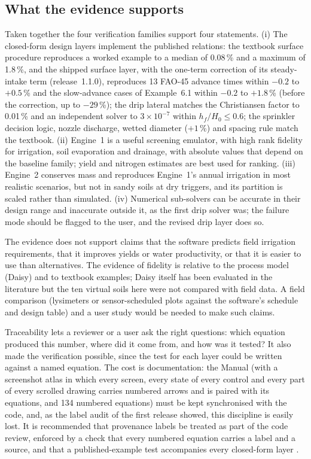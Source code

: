 \subsection{What the evidence supports}
Taken together the four verification families support four statements. (i) The closed-form design layers implement the published relations: the textbook surface procedure reproduces a worked example to a median of 0.08\,\% and a maximum of 1.8\,\%, and the shipped surface layer, with the one-term correction of its steady-intake term (release~1.1.0), reproduces 13 FAO-45 advance times within $-0.2$ to $+0.5$\,\% and the slow-advance cases of Example~6.1 within $-0.2$ to $+1.8$\,\% (before the correction, up to $-29$\,\%); the drip lateral matches the Christiansen factor to 0.01\,\% and an independent solver to $3\times10^{-7}$ within $h_f/H_0\le0.6$; the sprinkler decision logic, nozzle discharge, wetted diameter ($+1$\,\%) and spacing rule match the textbook. (ii) Engine~1 is a useful screening emulator, with high rank fidelity for irrigation, soil evaporation and drainage, with absolute values that depend on the baseline family; yield and nitrogen estimates are best used for ranking. (iii) Engine~2 conserves mass and reproduces Engine~1's annual irrigation in most realistic scenarios, but not in sandy soils at dry triggers, and its partition is scaled rather than simulated. (iv) Numerical sub-solvers can be accurate in their design range and inaccurate outside it, as the first drip solver was; the failure mode should be flagged to the user, and the revised drip layer does so.

The evidence does not support claims that the software predicts field irrigation requirements, that it improves yields or water productivity, or that it is easier to use than alternatives. The evidence of fidelity is relative to the process model (Daisy) and to textbook examples; Daisy itself has been evaluated in the literature \citep{Hansen2012,Holbak2026} but the ten virtual soils here were not compared with field data. A field comparison (lysimeters or sensor-scheduled plots against the software's schedule and design table) and a user study would be needed to make such claims.

Traceability lets a reviewer or a user ask the right questions: which equation produced this number, where did it come from, and how was it tested? It also made the verification possible, since the test for each layer could be written against a named equation. The cost is documentation: the Manual (with a screenshot atlas in which every screen, every state of every control and every part of every scrolled drawing carries numbered arrows and is paired with its equations, and 134 numbered equations) must be kept synchronised with the code, and, as the label audit of the first release showed, this discipline is easily lost. It is recommended that provenance labels be treated as part of the code review, enforced by a check that every numbered equation carries a label and a source, and that a published-example test accompanies every closed-form layer \citep{Jakeman2006,Refsgaard2004}.

